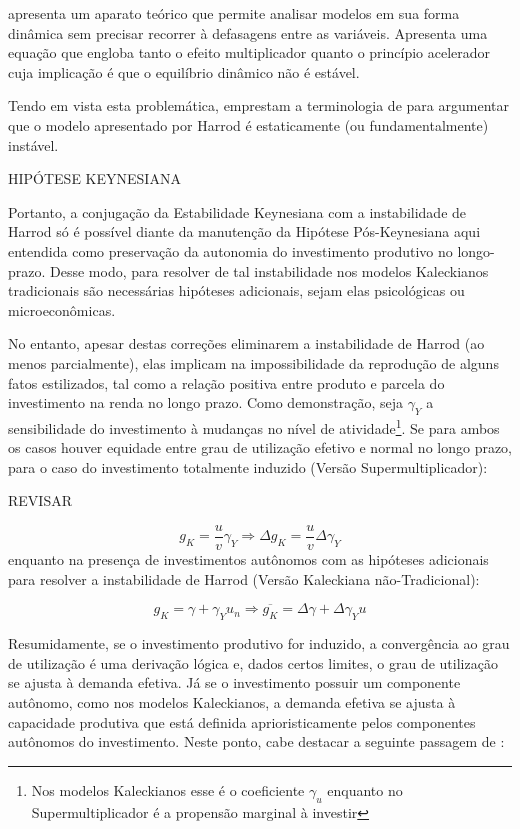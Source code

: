 
\textcite{harrod_essay_1939} apresenta um aparato teórico que permite analisar modelos em sua forma dinâmica sem precisar recorrer à defasagens entre as variáveis. Apresenta uma equação que engloba tanto o efeito multiplicador quanto o princípio acelerador cuja implicação é que o equilíbrio dinâmico não é estável. 



Tendo em vista esta problemática, \textcite{serrano_trouble_2017} emprestam a terminologia de \textcite{hicks_capital_1965} para argumentar que o modelo apresentado por Harrod é estaticamente (ou fundamentalmente) instável. 

HIPÓTESE KEYNESIANA

Portanto, a conjugação da Estabilidade Keynesiana com a instabilidade de Harrod só é possível diante da manutenção da Hipótese Pós-Keynesiana aqui entendida como preservação da autonomia do investimento produtivo no longo-prazo. Desse modo, para resolver de tal instabilidade nos modelos Kaleckianos tradicionais são necessárias hipóteses adicionais, sejam elas psicológicas ou microeconômicas. 


No entanto, apesar destas correções eliminarem a instabilidade de Harrod (ao menos parcialmente), elas implicam na impossibilidade da reprodução de alguns fatos estilizados, tal como a relação positiva entre produto e parcela do investimento na renda no longo prazo. Como demonstração, seja $\gamma_Y$ a sensibilidade do investimento à mudanças no nível de atividade\footnote{Nos modelos Kaleckianos esse é o coeficiente $\gamma_u$ enquanto no Supermultiplicador é a propensão marginal à investir}. Se para ambos os casos houver equidade entre grau de utilização efetivo e normal no longo prazo, para o caso do investimento totalmente induzido (Versão Supermultiplicador):

REVISAR

$$
g_K = \frac{u}{v}\gamma_Y \Rightarrow \Delta g_K = \frac{u}{v}\Delta\gamma_Y 
$$
enquanto na presença de investimentos autônomos com as hipóteses adicionais para resolver a instabilidade de Harrod (Versão Kaleckiana não-Tradicional):

$$
g_K = \gamma + \gamma_Y u_n \Rightarrow \overline{g_K} = \Delta \gamma + \Delta \gamma_Y u
$$

Resumidamente, se o investimento produtivo for induzido, a convergência ao grau de utilização é uma derivação lógica e, dados certos limites, o grau de utilização se ajusta à demanda efetiva. Já se o investimento possuir um componente autônomo, como nos modelos Kaleckianos, a demanda efetiva se ajusta à capacidade produtiva que está definida aprioristicamente pelos componentes autônomos do investimento. Neste ponto, cabe destacar a seguinte passagem de \textcite[p.~120, grifos nossos]{serrano_sraffian_1995}:

